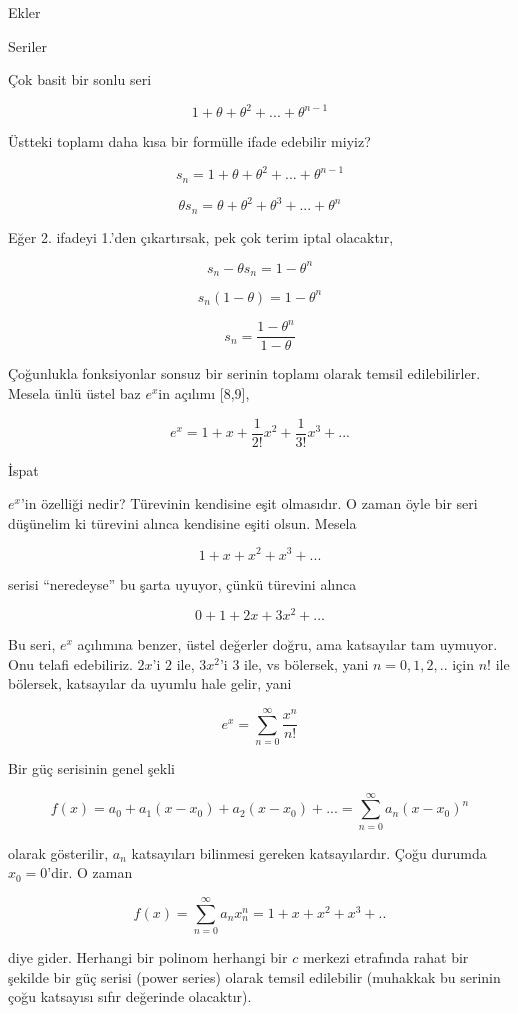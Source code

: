\documentclass[12pt,fleqn]{article}\usepackage{../../common}
\begin{document}
Ekler

Seriler

Çok basit bir sonlu seri

$$ 1 + \theta + \theta^2 + ... + \theta^{n-1} $$

Üstteki toplamı daha kısa bir formülle ifade edebilir miyiz? 

$$ s_n = 1 + \theta + \theta^2 + ... + \theta^{n-1} $$

$$ \theta s_n = \theta + \theta^2 + \theta^3 + ... + \theta^n $$

Eğer 2. ifadeyi 1.'den çıkartırsak, pek çok terim iptal olacaktır,

$$ s_n - \theta s_n = 1 - \theta^n $$

$$ s_n ( 1 - \theta) = 1 - \theta^n $$

$$ s_n = \frac{1 - \theta^n}{1 - \theta} $$

Çoğunlukla fonksiyonlar sonsuz bir serinin toplamı olarak temsil
edilebilirler. Mesela ünlü üstel baz $e^x$in açılımı [8,9],

$$ e^x = 1 + x + \frac{1}{2!}x^2 + \frac{1}{3!}x^3 + ... $$

İspat

$e^x$'in özelliği nedir? Türevinin kendisine eşit olmasıdır. O zaman öyle
bir seri düşünelim ki türevini alınca kendisine eşiti olsun. Mesela

$$ 1 + x + x^2 + x^3 + ... $$

serisi ``neredeyse'' bu şarta uyuyor, çünkü türevini alınca 

$$ 0 + 1 + 2x + 3x^2 + ... $$

Bu seri, $e^x$ açılımına benzer, üstel değerler doğru, ama katsayılar
tam uymuyor. Onu telafi edebiliriz. $2x$'i $2$ ile, $3x^2$'i $3$ ile, vs
bölersek, yani $n=0,1,2,..$ için $n!$ ile bölersek, katsayılar da uyumlu
hale gelir, yani 

$$ e^x = \sum_{ n=0}^{\infty} \frac{ x^n}{n!} $$

Bir güç serisinin genel şekli

$$ f(x) = a_0 + a_1(x-x_0) + a_2(x-x_0) + ... = \sum_{ n=0}^{\infty} a_n (x-x_0)^n$$

olarak gösterilir, $a_n$ katsayıları bilinmesi gereken katsayılardır. Çoğu
durumda $x_0=0$'dir. O zaman 

$$ f(x) = \sum_{ n=0}^{\infty} a_n x_n^n = 1+x+x^2+x^3+..$$

diye gider. Herhangi bir polinom herhangi bir $c$ merkezi etrafında rahat
bir şekilde bir güç serisi (power series) olarak temsil edilebilir
(muhakkak bu serinin çoğu katsayısı sıfır değerinde olacaktır). 
\end{document}
